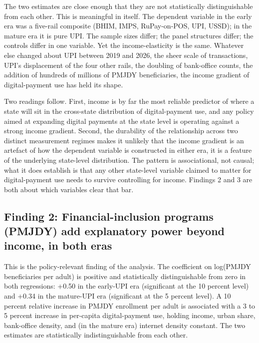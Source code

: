 \documentclass[
]{article}
\begin{document}
The two estimates are close enough that they are not statistically
distinguishable from each other. This is meaningful in itself. The
dependent variable in the early era was a five-rail composite (BHIM,
IMPS, RuPay-on-POS, UPI, USSD); in the mature era it is pure UPI. The
sample sizes differ; the panel structures differ; the controls differ in
one variable. Yet the income-elasticity is the same. Whatever else
changed about UPI between 2019 and 2026, the sheer scale of
transactions, UPI's displacement of the four other rails, the doubling
of bank-office counts, the addition of hundreds of millions of PMJDY
beneficiaries, the income gradient of digital-payment use has held its
shape.

Two readings follow. First, income is by far the most reliable predictor
of where a state will sit in the cross-state distribution of
digital-payment use, and any policy aimed at expanding digital payments
at the state level is operating against a strong income gradient.
Second, the durability of the relationship across two distinct
measurement regimes makes it unlikely that the income gradient is an
artefact of how the dependent variable is constructed in either era, it
is a feature of the underlying state-level distribution. The pattern is
associational, not causal; what it does establish is that any other
state-level variable claimed to matter for digital-payment use needs to
survive controlling for income. Findings 2 and 3 are both about which
variables clear that bar.

\subsection{Finding 2: Financial-inclusion programs (PMJDY) add
explanatory power beyond income, in both
eras}\label{finding-2-financial-inclusion-programs-pmjdy-add-explanatory-power-beyond-income-in-both-eras}

This is the policy-relevant finding of the analysis. The coefficient on
log(PMJDY beneficiaries per adult) is positive and statistically
distinguishable from zero in both regressions: +0.50 in the early-UPI
era (significant at the 10 percent level) and +0.34 in the mature-UPI
era (significant at the 5 percent level). A 10 percent relative increase
in PMJDY enrollment per adult is associated with a 3 to 5 percent
increase in per-capita digital-payment use, holding income, urban share,
bank-office density, and (in the mature era) internet density constant.
The two estimates are statistically indistinguishable from each other.
\end{document}
